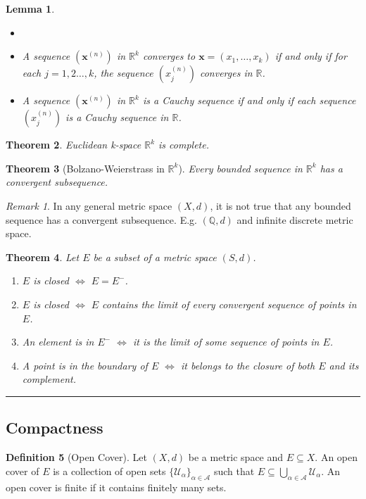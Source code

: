 \documentclass[12pt, lettersize]{book}
\theoremstyle{plain}
\newtheorem{thm}{Theorem}[section]
\newtheorem{lem}[thm]{Lemma}
\theoremstyle{definition}
\newtheorem{dfn}[thm]{Definition}
\theoremstyle{remark}
\newtheorem*{rem}{Remark}
\newcommand{\R}{\mathbb{R}}
\newcommand{\Q}{\mathbb{Q}}
\begin{document}
	\setcounter{equation}{0}
	\begin{lem}\label{def:sequence in R^k}
		\begin{itemize}
			\item[]
			\item A sequence $(\mathbf{x}^{(n)})$ in $\mathbb{R}^k$ converges to $\mathbf{x}=(x_1,\dots,x_k)$ if and only if for each $j=1,2\dots,k$, the sequence $(x_j^{(n)})$ converges in $\mathbb{R}$.
			\item A sequence $(\mathbf{x}^{(n)})$ in $\mathbb{R}^k$ is a Cauchy sequence if and only if each sequence $(x_j^{(n)})$ is a Cauchy sequence in $\mathbb{R}$.
		\end{itemize}	
	\end{lem}
	
	\begin{thm}
		Euclidean k-space $\mathbb{R}^k$ is complete.
	\end{thm}
	
	\begin{thm}[Bolzano-Weierstrass in $\R^k$]
		Every bounded sequence in $\mathbb{R}^k$ has a convergent subsequence.
	\end{thm}
	\begin{rem}
		In any general metric space $(X,d)$, it is not true that any bounded sequence has a convergent subsequence. E.g. $(\Q,d)$ and infinite discrete metric space.
	\end{rem}
	
	\begin{thm}
		Let $E$ be a subset of a metric space $(S,d)$.
		\begin{enumerate}
			\item $E$ is closed $\iff$ $E=E^-$.
			\item $E$ is closed $\iff$ $E$ contains the limit of every convergent sequence of points in $E$.
			\item An element is in $E^-$ $\iff$ it is the limit of some sequence of points in $E$.
			\item A point is in the boundary of $E$ $\iff$ it belongs to the closure of both $E$ and its complement.
		\end{enumerate}
	\end{thm}
	
	\noindent\rule{\textwidth}{1pt}
	\subsection*{Compactness}
	
	\begin{dfn}[Open Cover]
		Let $(X,d)$ be a metric space and $E\subseteq X$. An open cover of $E$ is a collection of open sets $\{\mathcal{U}_\alpha\}_{\alpha\in\mathcal{A}}$ such that $E\subseteq\bigcup_{\alpha\in\mathcal{A}}\mathcal{U}_\alpha$. An open cover is finite if it contains finitely many sets.
	\end{dfn}
	
\end{document}
